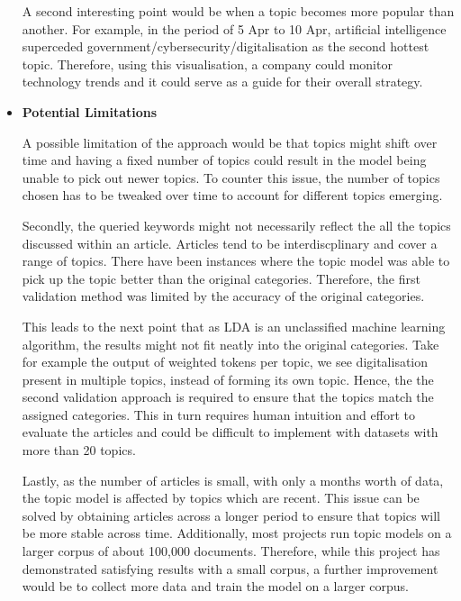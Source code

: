 \documentclass{article}
\begin{document}
\begin{titlepage}
\begin{itemize}
            \quad A second interesting point would be when a topic becomes more popular than another. For example, in the period of 5 Apr to 10 Apr, artificial intelligence superceded government/cybersecurity/digitalisation as the second hottest topic. Therefore, using this visualisation, a company could monitor technology trends and it could serve as a guide for their overall strategy. 
            
            
          \item[] \textbf{Potential Limitations}
          
          \quad A possible limitation of the approach would be that topics might shift over time and having a fixed number of topics could result in the model being unable to pick out newer topics. To counter this issue, the number of topics chosen has to be tweaked over time to account for different topics emerging.
          
          \quad Secondly, the queried keywords might not necessarily reflect the all the topics discussed within an article. Articles tend to be interdiscplinary and cover a range of topics. There have been instances where the topic model was able to pick up the topic better than the original categories. Therefore, the first validation method was limited by the accuracy of the original categories.
          
          \quad This leads to the next point that as LDA is an unclassified machine learning algorithm, the results might not fit neatly into the original categories. Take for example  the output of weighted tokens per topic, we see digitalisation present in multiple topics, instead of forming its own topic. Hence, the the second validation approach is required to ensure that the topics match the assigned categories. This in turn requires human intuition and effort to evaluate the articles and could be difficult to implement with datasets with more than 20 topics.
          
          \quad Lastly, as the number of articles is small, with only a months worth of data, the topic model is affected by topics which are recent. This issue can be solved by obtaining articles across a longer period to ensure that topics will be more stable across time. Additionally, most projects run topic models on a larger corpus of about 100,000 documents. Therefore, while this project has demonstrated satisfying results with a small corpus, a further improvement would be to collect more data and train the model on a larger corpus.
          

\end{itemize}
\end{titlepage}
\end{document}
